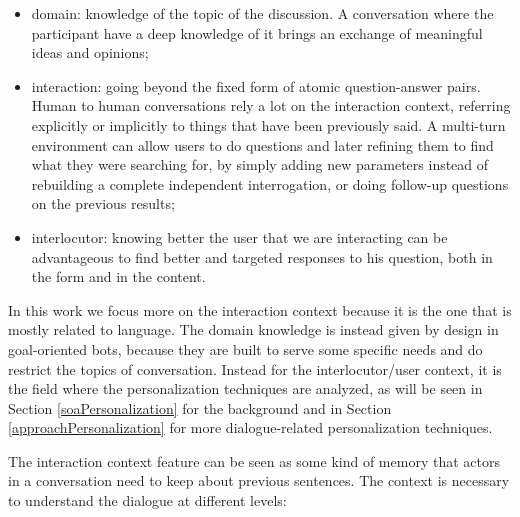 \begin{itemize}
	\item domain: knowledge of the topic of the discussion. A conversation where the participant have a deep knowledge of it brings an exchange of meaningful ideas and opinions;

	\item interaction: going beyond the fixed form of atomic question-answer pairs. Human to human conversations rely a lot on the interaction context, referring explicitly or implicitly to things that have been previously said. A multi-turn environment can allow users to do questions and later refining them to find what they were searching for, by simply adding new parameters instead of rebuilding a complete independent interrogation, or doing follow-up questions on the previous results;

	\item interlocutor: knowing better the user that we are interacting can be advantageous to find better and targeted responses to his question, both in the form and in the content.
\end{itemize}

In this work we focus more on the interaction context because it is the one that is mostly related to language. The domain knowledge is instead given by design in goal-oriented bots, because they are built to serve some specific needs and do restrict the topics of conversation. Instead for the interlocutor/user context, it is the field where the personalization techniques are analyzed, as will be seen in Section \ref{soaPersonalization} for the background and in Section \ref{approachPersonalization} for more dialogue-related personalization techniques.

The interaction context feature can be seen as some kind of memory that actors in a conversation need to keep about previous sentences. The context is necessary to understand the dialogue at different levels:

